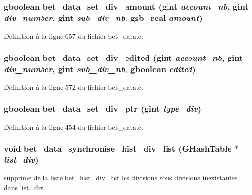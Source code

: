 \subsubsection[{bet\_\-data\_\-set\_\-div\_\-amount}]{\setlength{\rightskip}{0pt plus 5cm}gboolean bet\_\-data\_\-set\_\-div\_\-amount (gint {\em account\_\-nb}, \/  gint {\em div\_\-number}, \/  gint {\em sub\_\-div\_\-nb}, \/  {\bf gsb\_\-real} {\em amount})}\label{bet__data_8c_a3eeebe94c6f939ab1428c4a3860d7884}


Définition à la ligne 657 du fichier bet\_\-data.c.

\subsubsection[{bet\_\-data\_\-set\_\-div\_\-edited}]{\setlength{\rightskip}{0pt plus 5cm}gboolean bet\_\-data\_\-set\_\-div\_\-edited (gint {\em account\_\-nb}, \/  gint {\em div\_\-number}, \/  gint {\em sub\_\-div\_\-nb}, \/  gboolean {\em edited})}\label{bet__data_8c_ac97294377ef5262c8c3940ecdb8e2443}


Définition à la ligne 572 du fichier bet\_\-data.c.

\subsubsection[{bet\_\-data\_\-set\_\-div\_\-ptr}]{\setlength{\rightskip}{0pt plus 5cm}gboolean bet\_\-data\_\-set\_\-div\_\-ptr (gint {\em type\_\-div})}\label{bet__data_8c_aa8173c7d047bf72aef314ecf99689f73}


Définition à la ligne 454 du fichier bet\_\-data.c.

\subsubsection[{bet\_\-data\_\-synchronise\_\-hist\_\-div\_\-list}]{\setlength{\rightskip}{0pt plus 5cm}void bet\_\-data\_\-synchronise\_\-hist\_\-div\_\-list (GHashTable $\ast$ {\em list\_\-div})}\label{bet__data_8c_a91745c4a532e0241a7a257fb8aa53a93}
supprime de la liste bet\_\-hist\_\-div\_\-list les divisions sous divisions inexistantes dans list\_\-div. 

